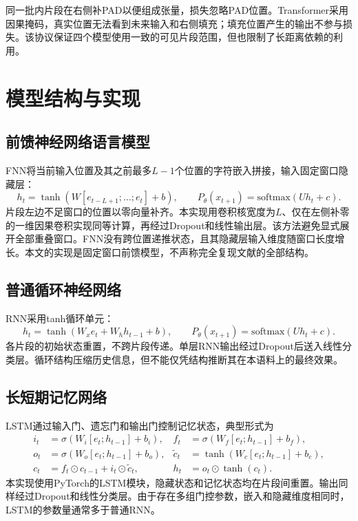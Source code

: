 ﻿\documentclass[UTF8,a4paper,12pt]{ctexart}
\begin{document}
同一批内片段在右侧补PAD以便组成张量，损失忽略PAD位置。Transformer采用因果掩码，真实位置无法看到未来输入和右侧填充；填充位置产生的输出不参与损失。该协议保证四个模型使用一致的可见片段范围，但也限制了长距离依赖的利用。

\section{模型结构与实现}
\subsection{前馈神经网络语言模型}
FNN将当前输入位置及其之前最多$L-1$个位置的字符嵌入拼接，输入固定窗口隐藏层：
\begin{equation}
 h_t=\tanh\!\left(W[ e_{t-L+1};\ldots;e_t]+b\right),
 \qquad P_\theta(x_{t+1})=\mathrm{softmax}(Uh_t+c).
\end{equation}
片段左边不足窗口的位置以零向量补齐。本实现用卷积核宽度为$L$、仅在左侧补零的一维因果卷积实现同等计算，再经过Dropout和线性输出层。该方法避免显式展开全部重叠窗口。FNN没有跨位置递推状态，且其隐藏层输入维度随窗口长度增长。本文的实现是固定窗口前馈模型，不声称完全复现文献\cite{bengio2003}的全部结构。

\subsection{普通循环神经网络}
RNN采用tanh循环单元：
\begin{equation}
 h_t=\tanh(W_xe_t+W_hh_{t-1}+b),
 \qquad P_\theta(x_{t+1})=\mathrm{softmax}(Uh_t+c).
\end{equation}
各片段的初始状态重置，不跨片段传递。单层RNN输出经过Dropout后送入线性分类层。循环结构压缩历史信息，但不能仅凭结构推断其在本语料上的最终效果。

\subsection{长短期记忆网络}
LSTM通过输入门、遗忘门和输出门控制记忆状态\cite{lstm1997}，典型形式为
\begin{align}
 i_t&=\sigma(W_i[e_t;h_{t-1}]+b_i), &
 f_t&=\sigma(W_f[e_t;h_{t-1}]+b_f),\\
 o_t&=\sigma(W_o[e_t;h_{t-1}]+b_o), &
 \widetilde c_t&=\tanh(W_c[e_t;h_{t-1}]+b_c),\\
 c_t&=f_t\odot c_{t-1}+i_t\odot\widetilde c_t, &
 h_t&=o_t\odot\tanh(c_t).
\end{align}
本实现使用PyTorch的LSTM模块，隐藏状态和记忆状态均在片段间重置。输出同样经过Dropout和线性分类层。由于存在多组门控参数，嵌入和隐藏维度相同时，LSTM的参数量通常多于普通RNN。
\end{document}
